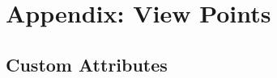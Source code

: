 \section{Appendix: View Points}
\label{sec:appendix_view_points} 

\subsection{Custom Attributes}
\label{sec:view_points_custom_attributes} 
